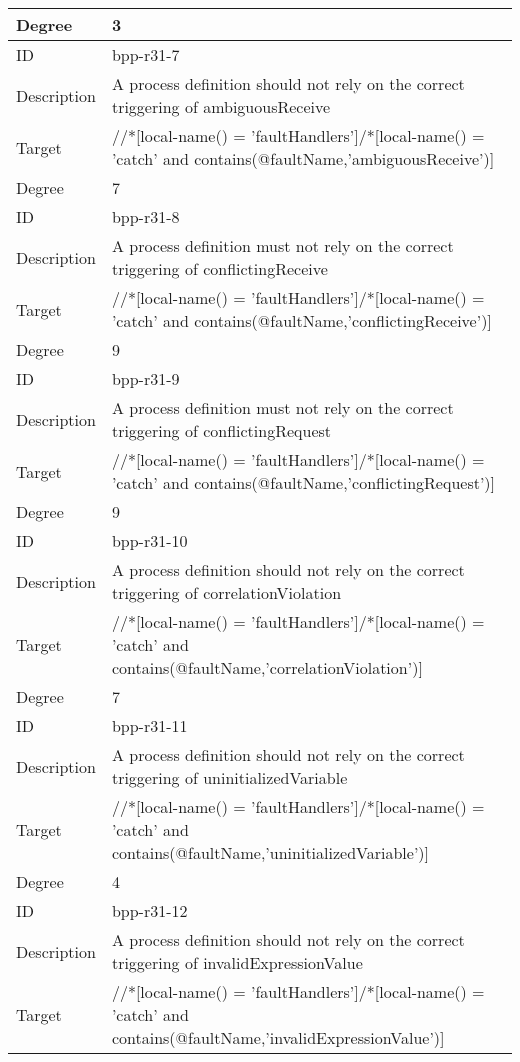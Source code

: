 \begin{center}
\begin{tiny}
\begin{longtable}{p{}|p{}}
\myrowcolour
Degree & 3\\
\midrule
ID & bpp-r31-7\\
\myrowcolour
Description &A process definition should not rely on the correct triggering of ambiguousReceive\\
Target & //*[local-name() = 'faultHandlers']/*[local-name() = 'catch' and contains(@faultName,'ambiguousReceive')]\\
\myrowcolour
Degree & 7\\
\midrule
ID & bpp-r31-8\\
\myrowcolour
Description &A process definition must not rely on the correct triggering of conflictingReceive\\
Target & //*[local-name() = 'faultHandlers']/*[local-name() = 'catch' and contains(@faultName,'conflictingReceive')]\\
\myrowcolour
Degree & 9\\
\midrule
ID & bpp-r31-9\\
\myrowcolour
Description &A process definition must not rely on the correct triggering of conflictingRequest\\
Target & //*[local-name() = 'faultHandlers']/*[local-name() = 'catch' and contains(@faultName,'conflictingRequest')]\\
\myrowcolour
Degree & 9\\
\midrule
ID & bpp-r31-10\\
\myrowcolour
Description &A process definition should not rely on the correct triggering of correlationViolation\\
Target & //*[local-name() = 'faultHandlers']/*[local-name() = 'catch' and contains(@faultName,'correlationViolation')]\\
\myrowcolour
Degree & 7\\
\midrule
ID & bpp-r31-11\\
\myrowcolour
Description &A process definition should not rely on the correct triggering of uninitializedVariable\\
Target & //*[local-name() = 'faultHandlers']/*[local-name() = 'catch' and contains(@faultName,'uninitializedVariable')]\\
\myrowcolour
Degree & 4\\
\midrule
ID & bpp-r31-12\\
\myrowcolour
Description &A process definition should not rely on the correct triggering of invalidExpressionValue\\
Target & //*[local-name() = 'faultHandlers']/*[local-name() = 'catch' and contains(@faultName,'invalidExpressionValue')]\\

\end{longtable}
\end{tiny}
\end{center}

